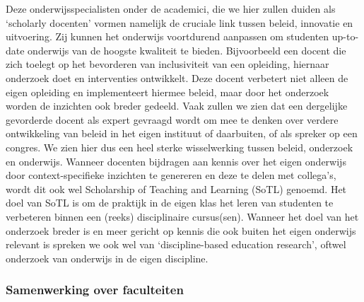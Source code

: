 \documentclass{jote-book}
\begin{document}
	Deze onderwijsspecialisten onder de academici, die we hier zullen duiden als ‘scholarly docenten' vormen namelijk de cruciale link tussen beleid, innovatie en uitvoering. Zij kunnen het onderwijs voortdurend aanpassen om studenten up-to-date onderwijs van de hoogste kwaliteit te bieden. Bijvoorbeeld een docent die zich toelegt op het bevorderen van inclusiviteit van een opleiding, hiernaar onderzoek doet en interventies ontwikkelt. Deze docent verbetert niet alleen de eigen opleiding en implementeert hiermee beleid, maar door het onderzoek worden de inzichten ook breder gedeeld. Vaak zullen we zien dat een dergelijke gevorderde docent als expert gevraagd wordt om mee te denken over verdere ontwikkeling van beleid in het eigen instituut of daarbuiten, of als spreker op een congres. We zien hier dus een heel sterke wisselwerking tussen beleid, onderzoek en onderwijs. Wanneer docenten bijdragen aan kennis over het eigen onderwijs door context-specifieke inzichten te genereren en deze te delen met collega's, wordt dit ook wel Scholarship of Teaching and Learning (SoTL) genoemd. Het doel van SoTL is om de praktijk in de eigen klas het leren van studenten te verbeteren binnen een (reeks) disciplinaire cursus(sen). Wanneer het doel van het onderzoek breder is en meer gericht op kennis die ook buiten het eigen onderwijs relevant is spreken we ook wel van ‘discipline-based education research', oftwel onderzoek van onderwijs in de eigen discipline.



	\subsubsection{Samenwerking over faculteiten}
\end{document}
